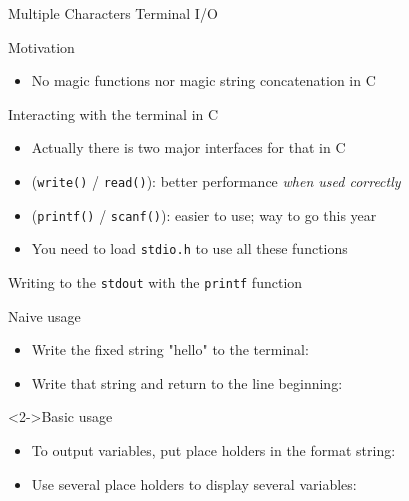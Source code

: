 \begin{Coupe}
\begin{frame}{Multiple Characters Terminal I/O}
\begin{block}{Motivation}
\begin{itemize}
    \item No  magic functions nor magic \fbox{+} string
      concatenation in C
    \end{itemize}
  \end{block}

  \begin{block}{Interacting with the terminal in C}
    \begin{itemize}
    \item Actually there is two major interfaces for that in C
    \item {} (\texttt{write()} / \texttt{read()}):
      better performance \textit{when used correctly}
    \item {} (\texttt{printf()} / \texttt{scanf()}):
      easier to use; \alert{way to go this year}
    \item You need to load \texttt{stdio.h} to use all these functions
    \end{itemize}
  \end{block}
\end{frame}
\begin{frame}{Writing to the \texttt{stdout} with the \texttt{printf} function}
  \vspace{-.7\baselineskip}
  \begin{block}{Naive usage}\vspace{-.2\baselineskip}
    \begin{itemize}
    \item Write the fixed string "hello" to the terminal: 
    \item Write that string and return to the line beginning:
    \end{itemize}
  \end{block}\vspace{-.8\baselineskip}
  \begin{block}<2->{Basic usage}\vspace{-.2\baselineskip}
    \begin{itemize}
    \item To output variables, put place holders in the format string:\\
    \item Use several place holders to display several variables:

\end{itemize}
\end{block}
\end{frame}
\end{Coupe}
